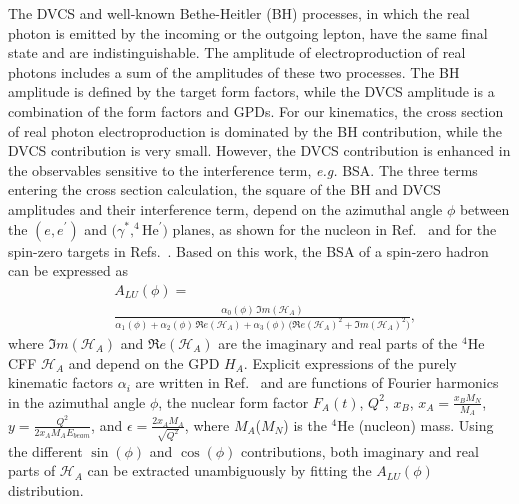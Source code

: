 \documentclass[twocolumn,nofootinbib,showpacs,prl,superscriptaddress,secnumarabic,amssymb,nobibnotes,aps,floatfix]{revtex4}
\begin{document}
The DVCS and well-known Bethe-Heitler (BH) processes, in which the real 
photon is emitted by the incoming or the outgoing lepton, have the same final 
state and are indistinguishable. The amplitude of electroproduction of real
photons includes a sum of the amplitudes of these two processes. The BH 
amplitude is defined by the target form factors, while the DVCS amplitude is 
a combination of the form factors and GPDs. For our kinematics, the cross 
section of real photon electroproduction is dominated by the BH 
contribution, while the DVCS contribution is very small. However, the DVCS contribution is
enhanced in the observables sensitive to the interference term, {\it e.g.} 
BSA. The three terms entering the cross section calculation,
the square of the BH and DVCS amplitudes and their interference term, depend on the
azimuthal angle $\phi$ between the $(e,e^\prime)$ and $(\gamma^*,^4$He$^\prime)$ planes,
as shown for the nucleon in Ref.~\cite{Belitsky:2001ns} and for the spin-zero targets
in Refs.~\cite{Kirchner:2003wt,Belitsky:2008bz}. Based on this work, the BSA 
of a spin-zero hadron can be expressed as
\begin{equation}
\begin{split}
&A_{LU}(\phi) = \\
&\frac{\alpha_{0}(\phi) \, \Im m(\mathcal{H}_{A})}
{\alpha_{1}(\phi) + \alpha_{2}(\phi) \, \Re e(\mathcal{H}_{A}) + \alpha_{3}(\phi) \, 
\big( \Re e(\mathcal{H}_{A})^{2} + \Im m(\mathcal{H}_{A})^{2} \big)},
\end{split}
\label{eq:A_LU-coh}
\end{equation}
where $\Im m(\mathcal{H}_{A})$ and $\Re e(\mathcal{H}_{A})$ are the imaginary 
and real parts of the $^4$He CFF $\mathcal{H}_{A}$ and depend on the GPD $H_A$.  
Explicit expressions of the purely kinematic factors $\alpha_i$ are written in
Ref.~\cite{Belitsky:2008bz} and are functions of Fourier harmonics in the 
azimuthal angle $\phi$, the nuclear form factor $F_A(t)$, $Q^2$, $x_B$,
$x_{A} = \frac{x_{B}M_{N}}{M_{A}}$, $y=\frac{Q^{2}}{2x_{A}M_{A}E_{beam}}$, and 
$\epsilon = \frac{2x_{A}M_{A}}{\sqrt{Q^{2}}}$, where $M_{A}$($M_{N}$) is the $^4$He 
(nucleon) mass. Using the different $\sin(\phi)$ and $\cos(\phi)$ contributions, 
both imaginary and real parts of $\mathcal{H}_{A}$ can be extracted unambiguously
by fitting the $A_{LU}(\phi)$ distribution.
\end{document}
